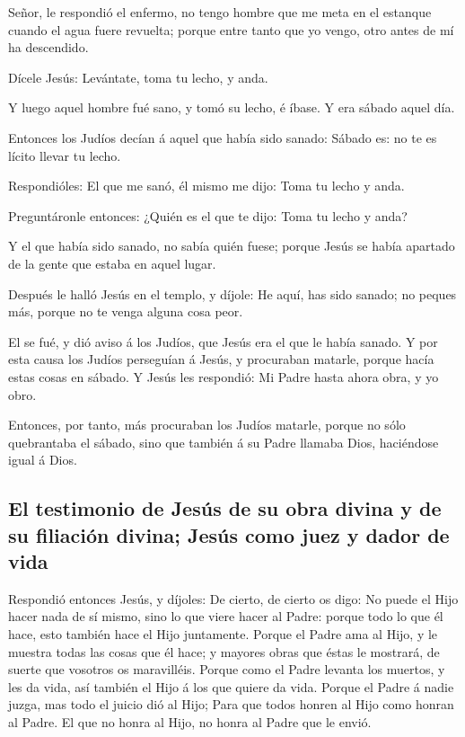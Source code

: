  Señor, le respondió el enfermo, no tengo hombre que me
meta en el estanque cuando el agua fuere revuelta; porque entre tanto
que yo vengo, otro antes de mí ha descendido.

 Dícele Jesús: Levántate, toma tu lecho, y anda.

 Y luego aquel hombre fué sano, y tomó su lecho, é íbase.
Y era sábado aquel día.

 Entonces los Judíos decían á aquel que había sido
sanado: Sábado es: no te es lícito llevar tu lecho.

 Respondióles: El que me sanó, él mismo me dijo: Toma tu
lecho y anda.

 Preguntáronle entonces: ¿Quién es el que te dijo: Toma
tu lecho y anda?

 Y el que había sido sanado, no sabía quién fuese; porque
Jesús se había apartado de la gente que estaba en aquel lugar.

 Después le halló Jesús en el templo, y díjole: He aquí,
has sido sanado; no peques más, porque no te venga alguna cosa peor.

 El se fué, y dió aviso á los Judíos, que Jesús era el
que le había sanado.  Y por esta causa los Judíos
perseguían á Jesús, y procuraban matarle, porque hacía estas cosas en
sábado.  Y Jesús les respondió: Mi Padre hasta ahora
obra, y yo obro.

 Entonces, por tanto, más procuraban los Judíos matarle,
porque no sólo quebrantaba el sábado, sino que también á su Padre
llamaba Dios, haciéndose igual á Dios.

\hypertarget{el-testimonio-de-jesuxfas-de-su-obra-divina-y-de-su-filiaciuxf3n-divina-jesuxfas-como-juez-y-dador-de-vida}{%
\subsection{El testimonio de Jesús de su obra divina y de su filiación
divina; Jesús como juez y dador de
vida}\label{el-testimonio-de-jesuxfas-de-su-obra-divina-y-de-su-filiaciuxf3n-divina-jesuxfas-como-juez-y-dador-de-vida}}

 Respondió entonces Jesús, y díjoles: De cierto, de
cierto os digo: No puede el Hijo hacer nada de sí mismo, sino lo que
viere hacer al Padre: porque todo lo que él hace, esto también hace el
Hijo juntamente.  Porque el Padre ama al Hijo, y le
muestra todas las cosas que él hace; y mayores obras que éstas le
mostrará, de suerte que vosotros os maravilléis.  Porque
como el Padre levanta los muertos, y les da vida, así también el Hijo á
los que quiere da vida.  Porque el Padre á nadie juzga,
mas todo el juicio dió al Hijo;  Para que todos honren al
Hijo como honran al Padre. El que no honra al Hijo, no honra al Padre
que le envió.

